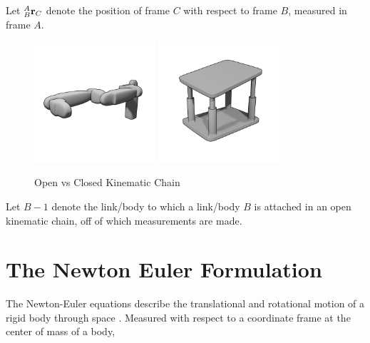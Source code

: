 \begin{definition}Let $^A_B\mathbf{r}_C$ denote the position of frame $C$ with respect to frame $B$, measured in frame $A$.
\begin{figure}[H]
    \centering
    \includegraphics[width=0.4\textwidth]{Figures/Intro/OKC.png}
    \includegraphics[width=0.4\textwidth]{Figures/Intro/NOKC.png}
    \caption{Open vs Closed Kinematic Chain}
    \label{fig:okc}
\end{figure}
\end{definition}


\begin{definition}
Let $B-1$ denote the link/body to which a link/body $B$ is attached in an open kinematic chain, off of which measurements are made.
\end{definition}

\section{The Newton Euler Formulation}

The Newton-Euler equations describe the translational and rotational motion of a rigid body through space \Cite{Hahn, asada_slotine_1986, shabana_2010}. Measured with respect to a coordinate frame at the center of mass of a body, 


